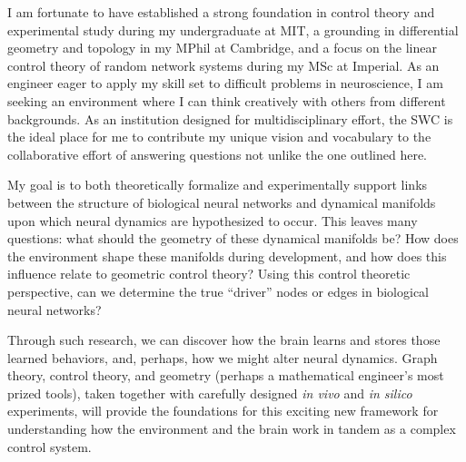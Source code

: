 \documentclass[a4paper,12pt]{article}
\begin{document}

I am fortunate to have established a strong foundation in control theory and experimental study during my undergraduate at MIT, a grounding in differential geometry and topology in my MPhil at Cambridge, and a focus on the linear control theory of random network systems during my MSc at Imperial. As an engineer eager to apply my skill set to difficult problems in neuroscience, I am seeking an environment where I can think creatively with others from different backgrounds. As an institution designed for multidisciplinary effort, the SWC is the ideal place for me to contribute my unique vision and vocabulary to the collaborative effort of answering questions not unlike the one outlined here. 


My goal is to both theoretically formalize and experimentally support links between the structure of biological neural networks and dynamical manifolds upon which neural dynamics are hypothesized to occur. This leaves many questions: what should the geometry of these dynamical manifolds be? How does the environment shape these manifolds during development, and how does this influence relate to geometric control theory? Using this control theoretic perspective, can we determine the true ``driver'' nodes or edges in biological neural networks?

Through such research, we can discover how the brain learns and stores those learned behaviors, and, perhaps, how we might  alter neural dynamics. Graph theory, control theory, and geometry (perhaps a mathematical engineer's most prized tools), taken together with carefully designed \textit{in vivo} and \textit{in silico} experiments, will provide the foundations for this exciting new framework for understanding how the environment and the brain work in tandem as a complex control system. 


\newpage


\end{document}
